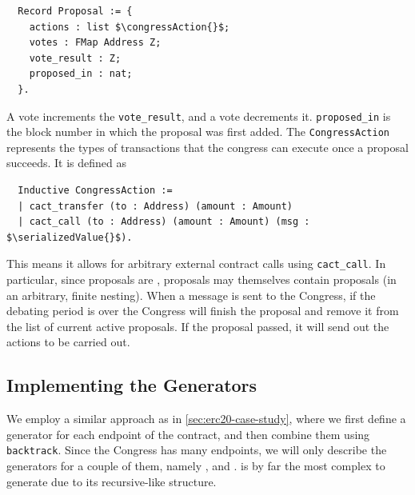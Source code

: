 \documentclass[twoside,11pt,openright]{report}
\newenvironment{code}{\captionsetup{type=figure, singlelinecheck=off, justification=raggedleft}}{}
\newcommand{\coq}[1]{\texttt{#1}}
\begin{document}
\begin{code}
\label{def:congress-proposal}
\begin{verbatim}
  Record Proposal := {
    actions : list $\congressAction{}$;
    votes : FMap Address Z;
    vote_result : Z;
    proposed_in : nat;
  }.
\end{verbatim}
\end{code}
A \votefor{} vote increments the \coq{vote\_result}, and a \voteagainst{} vote decrements it. \coq{proposed\_in} is the block number in which the proposal was first added. The \coq{CongressAction} represents the types of transactions that the congress can execute once a proposal succeeds. It is defined as
\begin{code}
\label{def:CongressAction}
\begin{verbatim}
  Inductive CongressAction :=
  | cact_transfer (to : Address) (amount : Amount)
  | cact_call (to : Address) (amount : Amount) (msg : $\serializedValue{}$).
\end{verbatim}
\end{code}
This means it allows for arbitrary external contract calls using \coq{cact\_call}. In particular, since proposals are \serializable{}, proposals may themselves contain proposals (in an arbitrary, finite nesting). When a \finishproposal{} message is sent to the Congress, if the debating period is over the Congress will finish the proposal and remove it from the list of current active proposals. If the proposal passed, it will send out the actions to be carried out.

\subsection{Implementing the Generators}
We employ a similar approach as in \autoref{sec:erc20-case-study}, where we first define a generator for each endpoint of the contract, and then combine them using \coq{backtrack}. Since the Congress has many endpoints, we will only describe the generators for a couple of them, namely \finishproposal{}, and \createproposal{}. \createproposal{} is by far the most complex to generate due to its recursive-like structure.
\end{document}
